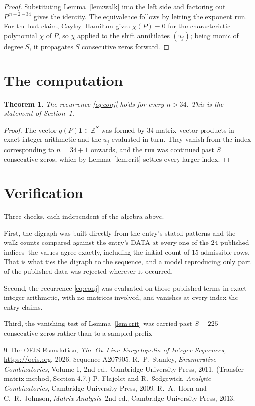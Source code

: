 \documentclass[11pt,a4paper]{article}
\theoremstyle{plain}
\newtheorem{theorem}{Theorem}
\theoremstyle{definition}
\begin{document}
\begin{proof}
Substituting Lemma~\ref{lem:walk} into the left side and factoring out
$P^{\,n-2-34}$ gives the identity. The equivalence follows by letting the exponent
run. For the last claim, Cayley--Hamilton gives $\chi(P)=0$ for the characteristic
polynomial $\chi$ of $P$, so $\chi$ applied to the shift annihilates $(u_j)$; being monic of
degree $S$, it propagates $S$ consecutive zeros forward.
\end{proof}

\section{The computation}

\begin{theorem}
The recurrence \eqref{eq:conj} holds for every $n>34$. This is the statement of
Section~1.
\end{theorem}

\begin{proof}
The vector $q(P)\mathbf{1}\in\mathbb{Z}^{S}$ was formed by $34$ matrix--vector
products in exact integer arithmetic and the $u_j$ evaluated in turn. They vanish from the
index corresponding to $n=34+1$ onwards, and the run was continued past $S$ consecutive
zeros, which by Lemma~\ref{lem:crit} settles every larger index.
\end{proof}

\section{Verification}

Three checks, each independent of the algebra above.

First, the digraph was built directly from the entry's stated patterns and the walk counts
compared against the entry's DATA at every one of the $24$ published indices; the
values agree exactly, including the initial count of $15$ admissible rows. That is
what ties the digraph to the sequence, and a model reproducing only part of the published
data was rejected wherever it occurred.

Second, the recurrence \eqref{eq:conj} was evaluated on those published terms in exact
integer arithmetic, with no matrices involved, and vanishes at every index the entry claims.

Third, the vanishing test of Lemma~\ref{lem:crit} was carried past $S=225$ consecutive
zeros rather than to a sampled prefix.

\begin{thebibliography}{9}
 The OEIS Foundation, \emph{The On-Line Encyclopedia of Integer
Sequences}, \url{https://oeis.org}, 2026. Sequence A207905.
 R.~P.~Stanley, \emph{Enumerative Combinatorics}, Volume 1, 2nd ed.,
Cambridge University Press, 2011. (Transfer-matrix method, Section 4.7.)
 P.~Flajolet and R.~Sedgewick, \emph{Analytic Combinatorics}, Cambridge
University Press, 2009.
 R.~A.~Horn and C.~R.~Johnson, \emph{Matrix Analysis}, 2nd ed., Cambridge
University Press, 2013.
\end{thebibliography}
\end{document}
